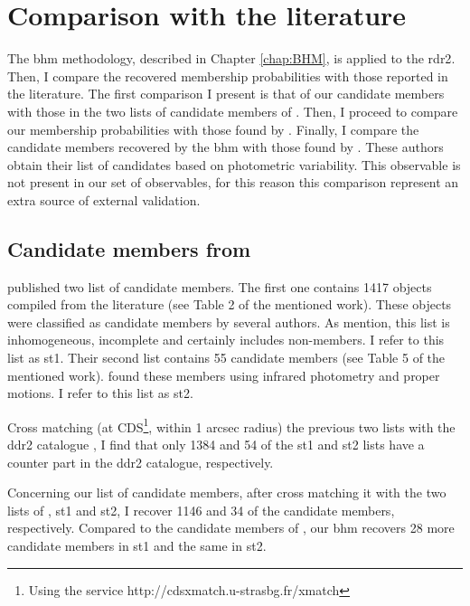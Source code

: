  
\section{Comparison with the literature}
\label{sect:memberscomparison}

The \gls{bhm} methodology, described in Chapter \ref{chap:BHM}, is applied to the \gls{rdr2}. Then, I compare the recovered membership probabilities with those reported in the literature. The first comparison I present is that of our candidate members with those in the two lists of candidate members of \citet{Stauffer2007}. Then, I proceed to compare our membership probabilities with those found by \citet{Bouy2015}. Finally, I compare the candidate members recovered by the \gls{bhm} with those found by \citet{Rebull2016}. These authors obtain their list of candidates based on photometric variability. This observable is not present in our set of observables, for this reason this comparison represent an extra source of external validation.  


\subsection{Candidate members from \citet{Stauffer2007}}

\citet{Stauffer2007} published two list of candidate members. The first one contains 1417 objects compiled from the literature (see Table 2 of the mentioned work). These objects were classified as candidate members by several authors. As \citet{Stauffer2007} mention, this list is inhomogeneous, incomplete and certainly includes non-members. I refer to this list as \gls{st1}. Their second list contains 55 candidate members (see Table 5 of the mentioned work). \citet{Stauffer2007} found these members using infrared photometry and proper motions. I refer to this list as \gls{st2}.

Cross matching (at CDS\footnote{ Using the service http://cdsxmatch.u-strasbg.fr/xmatch}, within 1 arcsec radius) the previous two lists with the \gls{ddr2} catalogue \citep{Bouy2015}, I find that only 1384 and 54 of the \gls{st1} and \gls{st2} lists have a counter part in the \gls{ddr2} catalogue, respectively. 

Concerning our list of candidate members, after cross matching it with the two lists of \citet{Stauffer2007}, \gls{st1} and \gls{st2}, I recover 1146 and 34 of the candidate members, respectively. Compared to the candidate members of \citet{Bouy2015}, our \gls{bhm} recovers 28 more candidate members in \gls{st1} and the same in \gls{st2}.


